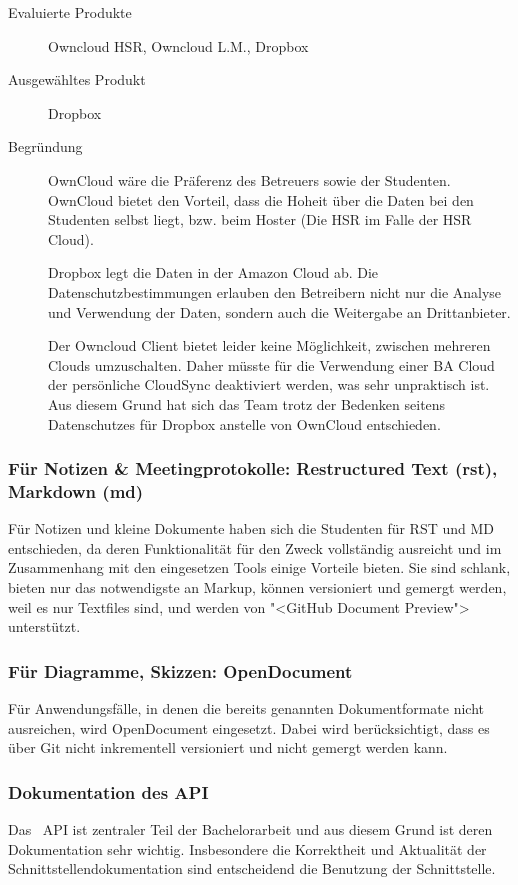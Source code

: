 				\begin{description}
					\item[Evaluierte Produkte] Owncloud HSR, Owncloud L.M., Dropbox
					\item[Ausgewähltes Produkt] Dropbox
					\item[Begründung] OwnCloud wäre die Präferenz des Betreuers sowie der Studenten. 
						OwnCloud bietet den Vorteil, dass die Hoheit über die Daten bei den Studenten selbst liegt, bzw. beim Hoster (Die HSR im Falle der HSR Cloud).
						
						Dropbox legt die Daten in der Amazon Cloud ab. 
						Die Datenschutzbestimmungen erlauben den Betreibern nicht nur die Analyse und Verwendung der Daten, 
						sondern auch die Weitergabe an Drittanbieter.
						
						Der Owncloud Client bietet leider keine Möglichkeit, 
						zwischen mehreren Clouds umzuschalten. 
						Daher müsste für die Verwendung einer BA Cloud der persönliche CloudSync deaktiviert werden, 
						was sehr unpraktisch ist.						
						Aus diesem Grund hat sich das Team trotz der Bedenken seitens Datenschutzes für Dropbox anstelle von OwnCloud entschieden.
				\end{description}

			\subsubsection{Für Notizen \& Meetingprotokolle: Restructured Text (rst), Markdown (md)}
				Für Notizen und kleine Dokumente haben sich die Studenten für RST und MD entschieden, 
				da deren Funktionalität für den Zweck vollständig ausreicht und im Zusammenhang mit den eingesetzen Tools einige Vorteile bieten. 
				Sie sind schlank, bieten nur das notwendigste an Markup, können versioniert und gemergt werden,
				weil es nur Textfiles sind, und werden von "<GitHub Document Preview"> unterstützt.

			\subsubsection{Für Diagramme, Skizzen: OpenDocument}
				Für Anwendungsfälle, in denen die bereits genannten Dokumentformate nicht ausreichen, 
				wird OpenDocument eingesetzt. Dabei wird berücksichtigt, 
				dass es über Git nicht inkrementell versioniert und nicht
				gemergt werden kann.
				
			\subsubsection{Dokumentation des API}
				Das \eeppi\ API ist zentraler Teil der Bachelorarbeit und aus diesem Grund ist deren Dokumentation sehr wichtig. Insbesondere die Korrektheit und Aktualität der Schnittstellendokumentation sind entscheidend die Benutzung der Schnittstelle.
				
